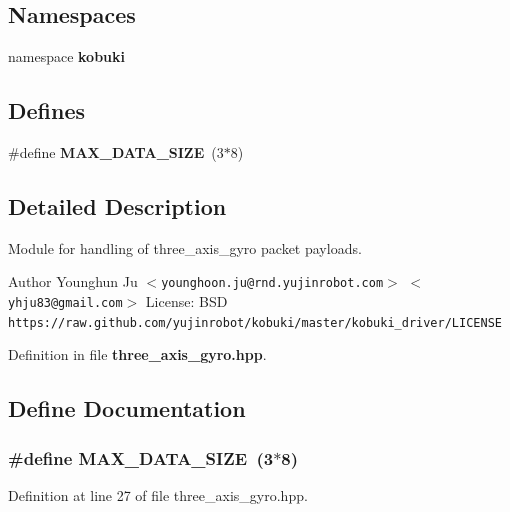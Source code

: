 \subsection*{\-Namespaces}
\begin{DoxyCompactItemize}
\item 
namespace {\bf kobuki}
\end{DoxyCompactItemize}
\subsection*{\-Defines}
\begin{DoxyCompactItemize}
\item 
\#define {\bf \-M\-A\-X\-\_\-\-D\-A\-T\-A\-\_\-\-S\-I\-Z\-E}~(3$\ast$8)
\end{DoxyCompactItemize}


\subsection{\-Detailed \-Description}
\-Module for handling of three\-\_\-axis\-\_\-gyro packet payloads. \begin{DoxyAuthor}{\-Author}
\-Younghun \-Ju $<${\tt younghoon.\-ju@rnd.\-yujinrobot.\-com}$>$ $<${\tt yhju83@gmail.\-com}$>$ \-License\-: \-B\-S\-D {\tt https\-://raw.\-github.\-com/yujinrobot/kobuki/master/kobuki\-\_\-driver/\-L\-I\-C\-E\-N\-S\-E} 
\end{DoxyAuthor}


\-Definition in file {\bf three\-\_\-axis\-\_\-gyro.\-hpp}.



\subsection{\-Define \-Documentation}
\subsubsection[{\-M\-A\-X\-\_\-\-D\-A\-T\-A\-\_\-\-S\-I\-Z\-E}]{\setlength{\rightskip}{0pt plus 5cm}\#define {\bf \-M\-A\-X\-\_\-\-D\-A\-T\-A\-\_\-\-S\-I\-Z\-E}~(3$\ast$8)}\label{three__axis__gyro_8hpp_a87f68e96fb938eddc39ad1f19d923a96}


\-Definition at line 27 of file three\-\_\-axis\-\_\-gyro.\-hpp.


